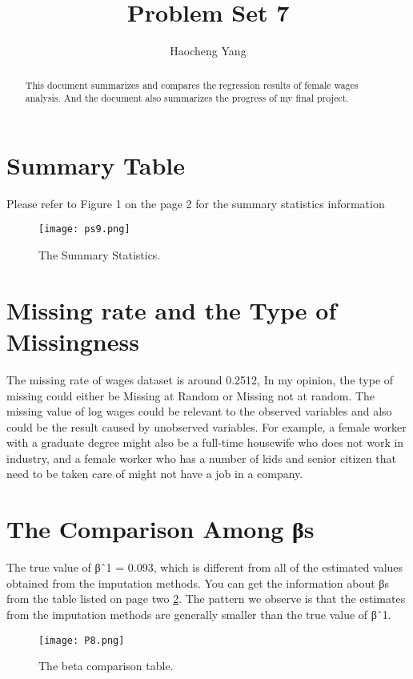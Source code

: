 \documentclass{article}
\title{Problem Set 7}
\author{Haocheng Yang}
\begin{document}
\maketitle

\begin{abstract}
This document summarizes and compares the regression results of female wages analysis. And the document also summarizes the progress of my final project.
\end{abstract}

\section{Summary Table}
Please refer to Figure 1 on the page 2 for the summary statistics information
\begin{figure}
\texttt{[image: ps9.png]}
\caption{\label{fig:P7} The Summary Statistics.}
\end{figure}


\section{Missing rate and the Type of Missingness}
The missing rate of wages dataset is around 0.2512, In my opinion, the type of missing could either be Missing at Random or Missing not at random. The missing value of log wages could be relevant to the observed variables and also could be the result caused by unobserved variables. For example, a female worker with a graduate degree might also be a full-time housewife who does not work in industry, and a female worker who has a number of kids and senior citizen that need to be taken care of might not have a job in a company.


\section{The Comparison Among βs}
The true value of βˆ1 = 0.093, which is different from all of the estimated values obtained from the imputation methods. You can get the information about βs from the table listed on page two \ref{fig:P7}. The pattern we observe is that the estimates from the imputation methods are generally smaller than the true value of βˆ1. 

\begin{figure}
\texttt{[image: P8.png]}
\caption{\label{fig:P7} The beta comparison table.}
\end{figure}
\end{document}
